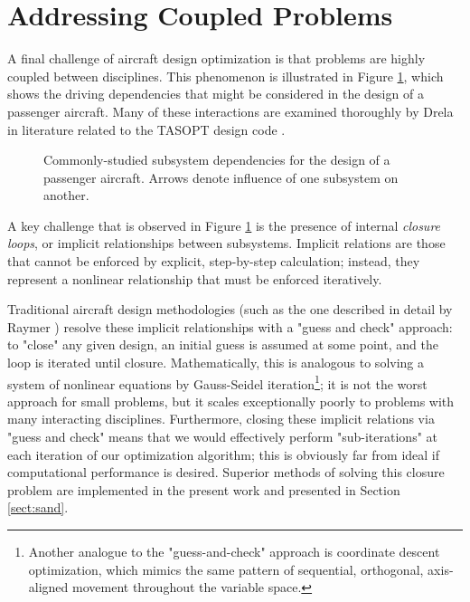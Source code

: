 \section{Addressing Coupled Problems}
\label{sect:coupling}

A final challenge of aircraft design optimization is that problems are highly coupled between disciplines. This phenomenon is illustrated in Figure \ref{fig:coupled-subsystems}, which shows the driving dependencies that might be considered in the design of a passenger aircraft. Many of these interactions are examined thoroughly by Drela in literature related to the TASOPT design code \cite{Drela2011, tasopt}.

\begin{figure}[H]
    \centering
    \ifdraft{}{\centerline{}}
    \caption{Commonly-studied subsystem dependencies for the design of a passenger aircraft. Arrows denote influence of one subsystem on another.}
    \label{fig:coupled-subsystems}
\end{figure}

A key challenge that is observed in Figure \ref{fig:coupled-subsystems} is the presence of internal \textit{closure loops}, or implicit relationships between subsystems. Implicit relations are those that cannot be enforced by explicit, step-by-step calculation; instead, they represent a nonlinear relationship that must be enforced iteratively.

Traditional aircraft design methodologies (such as the one described in detail by Raymer \cite{raymer}) resolve these implicit relationships with a "guess and check" approach: to "close" any given design, an initial guess is assumed at some point, and the loop is iterated until closure. Mathematically, this is analogous to solving a system of nonlinear equations by Gauss-Seidel iteration\footnote{Another analogue to the "guess-and-check" approach is coordinate descent optimization, which mimics the same pattern of sequential, orthogonal, axis-aligned movement throughout the variable space.}; it is not the worst approach for small problems, but it scales exceptionally poorly to problems with many interacting disciplines. Furthermore, closing these implicit relations via "guess and check" means that we would effectively perform "sub-iterations" at each iteration of our optimization algorithm; this is obviously far from ideal if computational performance is desired. Superior methods of solving this closure problem are implemented in the present work and presented in Section \ref{sect:sand}.


